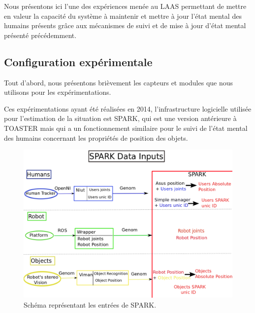 \documentclass[a4paper,11pt,twoside]{StyleThese}
\begin{document}
Nous présentons ici l'une des expériences menée au LAAS permettant de mettre en valeur la capacité du système à maintenir et mettre à jour l'état mental des humains présents grâce aux mécanismes de suivi et de mise à jour d'état mental présenté précédemment.

\subsection{Configuration expérimentale}
\label{sec:chap2expconf}
Tout d'abord, nous présentons brièvement les capteurs et modules que nous utilisons pour les expérimentations.


Ces expérimentations ayant été réalisées en 2014, l'infrastructure logicielle utilisée pour l'estimation de la situation est SPARK\cite{Milliez2014}, qui est une version antérieure à TOASTER mais qui a un fonctionnement similaire pour le suivi de l'état mental des humains concernant les propriétés de position des objets.

\begin{figure}[ht!]
  \centering
 \includegraphics[width=0.99\linewidth]{./img/spark_input.png} 
  \caption {Schéma représentant les entrées de SPARK.}
  \label{fig:inputSpark}
\end{figure}
\end{document}
